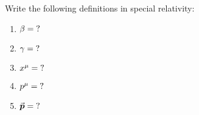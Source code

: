 

\vspace*{\fill}
\centering

Write the following definitions in special relativity:
\begin{enumerate}
    \item $\beta = {\rm ?}$ 
    \item $\gamma = {\rm ?}$
    \item $x^{\mu} = {\rm ?}$
    \item $p^{\mu} = {\rm ?}$
    \item $\va*{p} = {\rm ?}$
\end{enumerate}

\centering
\vspace*{\fill}

